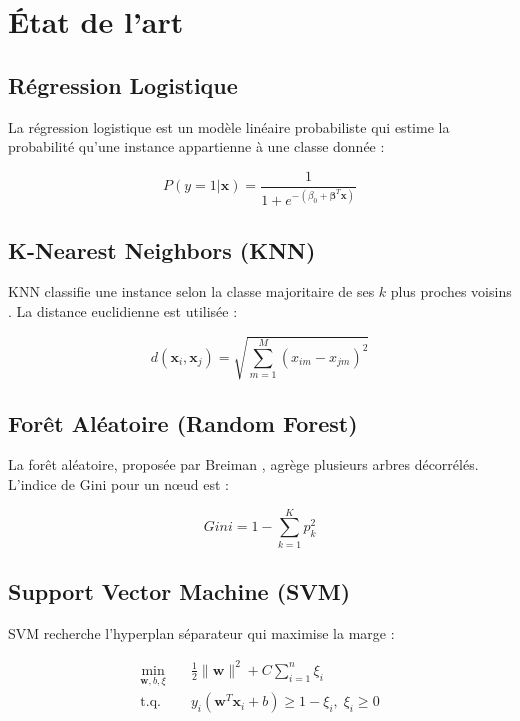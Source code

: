 \documentclass[conference]{IEEEtran}
\begin{document}
\section{État de l'art}

\subsection{Régression Logistique}

La régression logistique est un modèle linéaire probabiliste qui estime la probabilité qu'une instance appartienne à une classe donnée \cite{hastie2009} :

\begin{equation}
P(y=1|\mathbf{x}) = \frac{1}{1 + e^{-(\beta_0 + \boldsymbol{\beta}^T \mathbf{x})}}
\end{equation}

\subsection{K-Nearest Neighbors (KNN)}

KNN classifie une instance selon la classe majoritaire de ses $k$ plus proches voisins \cite{cover1967}. La distance euclidienne est utilisée :

\begin{equation}
d(\mathbf{x}_i, \mathbf{x}_j) = \sqrt{\sum_{m=1}^{M} (x_{im} - x_{jm})^2}
\end{equation}

\subsection{Forêt Aléatoire (Random Forest)}

La forêt aléatoire, proposée par Breiman \cite{breiman2001}, agrège plusieurs arbres décorrélés. L'indice de Gini pour un nœud est :

\begin{equation}
Gini = 1 - \sum_{k=1}^{K} p_k^2
\end{equation}

\subsection{Support Vector Machine (SVM)}

SVM recherche l'hyperplan séparateur qui maximise la marge \cite{cortes1995} :

\begin{equation}
\begin{aligned}
\min_{\mathbf{w},b,\xi} \quad & \frac{1}{2}\|\mathbf{w}\|^2 + C\sum_{i=1}^{n}\xi_i \\
\text{t.q.} \quad & y_i(\mathbf{w}^T\mathbf{x}_i + b) \geq 1 - \xi_i, \; \xi_i \geq 0
\end{aligned}
\end{equation}
\end{document}
